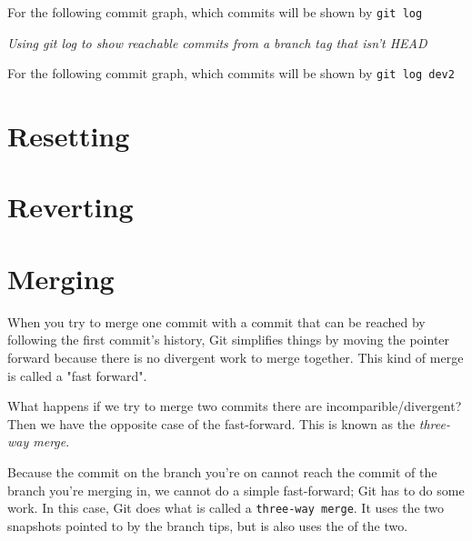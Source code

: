 \frmrule

\begin{example}
For the following commit graph, which commits will be shown by \lstinline{git log}
\end{example}

\frmrule

\textit{Using git log to show reachable commits from a branch tag that isn't HEAD}


\frmrule

\begin{example}
For the following commit graph, which commits will be shown by \lstinline{git log dev2}
\end{example}


\section{Resetting}

\section{Reverting}


\section{Merging}

When you try to merge one commit with a commit that can be reached by following the
first commit’s history, Git simplifies things by moving the pointer forward because there
is no divergent work to merge together. This kind of merge is called a "fast forward".


What happens if we try to merge two commits there are incomparible/divergent?
Then we have the opposite case of the fast-forward. This is known as the \textit{three-way 
merge}.



Because the commit on the branch you're on cannot reach the commit 
of the branch you’re merging in, we cannot do a simple fast-forward;
Git has to do some work. In this case, Git does what is called a \lstinline{three-way merge}.
It uses the two snapshots pointed to by the branch tips, but is also uses 
the  of the two.


